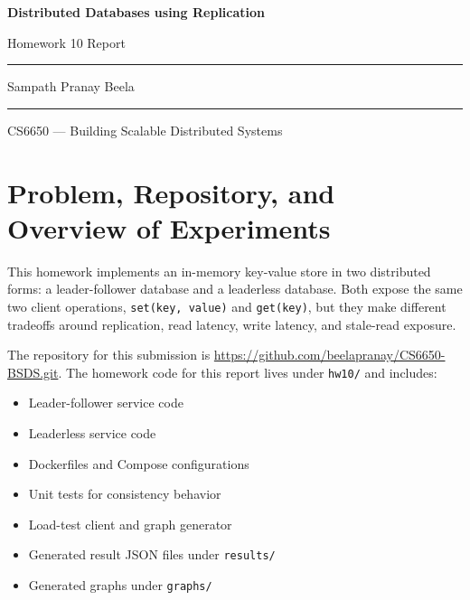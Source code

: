 \documentclass[11pt]{article}
\begin{document}

\begin{titlepage}
  \centering
  \vspace*{3cm}
  {\Huge\textbf{Distributed Databases using Replication}\par}
  \vspace{1.2em}
  {\LARGE Homework 10 Report\par}
  \vspace{2em}
  \rule{0.6\textwidth}{0.4pt}\par
  \vspace{2em}
  {\Large Sampath Pranay Beela\par}
  \vspace{2em}
  \rule{0.6\textwidth}{0.4pt}\par
  \vspace{2em}
  {\large CS6650 --- Building Scalable Distributed Systems\par}
\end{titlepage}
\clearpage
{}

\section{Problem, Repository, and Overview of Experiments}

This homework implements an in-memory key-value store in two distributed forms: a leader-follower database and a leaderless database. Both expose the same two client operations, \texttt{set(key, value)} and \texttt{get(key)}, but they make different tradeoffs around replication, read latency, write latency, and stale-read exposure.

The repository for this submission is \url{https://github.com/beelapranay/CS6650-BSDS.git}. The homework code for this report lives under \texttt{hw10/} and includes:
\begin{itemize}
\item Leader-follower service code
\item Leaderless service code
\item Dockerfiles and Compose configurations
\item Unit tests for consistency behavior
\item Load-test client and graph generator
\item Generated result JSON files under \texttt{results/}
\item Generated graphs under \texttt{graphs/}
\end{itemize}
\end{document}
